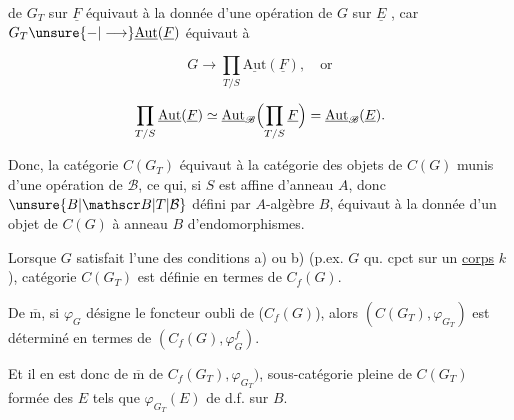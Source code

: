 
de $G_T$ sur $\underline F$ équivaut à la donnée d'une opération de $G$ sur $\underline E$ , car $G_T\unsure{-|\longrightarrow}\underline{\mathrm{Aut}}(\underline F)$ équivaut à

\[
G\longrightarrow\prod_{T/S}\underline{\mathrm{Aut}}(\underline F),\quad\text{or}
\]

\[
\prod_{T/S}\underline{\mathrm{Aut}}(\underline F)\simeq
\underline{\mathrm{Aut}}_{\mathscr B}\Bigl(\prod_{T/S}\underline F\Bigr)
=\underline{\mathrm{Aut}}_{\mathscr B}(\underline E).
\]

Donc, la catégorie $C(G_T)$ équivaut à la catégorie des objets de $C(G)$ munis d'une opération de $\mathscr B$, ce qui, si $S$ est affine d'anneau $A$, donc $\unsure{B|\mathscr B|T|\mathcal B}$ défini par $A$-algèbre $B$, équivaut à la  donnée d'un objet de $C(G)$ à anneau $B$ d'endomorphismes.

Lorsque $G$ satisfait l'une des conditions a) ou b) (p.ex. $G$ qu. cpct sur un \uline{corps} $k$),  catégorie $C(G_T)$ est définie en termes de $C_f(G)$.

De $\overline{\mathrm m}$, si $\varphi_G$  désigne le foncteur oubli de  ($C_f(G)$), alors $(C(G_T),\varphi_{G_T})$ est déterminé en termes de $(C_f(G),\varphi_G^f)$.

Et il en est donc de $\overline{\mathrm m}$ de $C_f(G_T),\varphi_{G_T})$, sous-catégorie pleine de $C(G_T)$ formée des $E$ tels que $\varphi_{G_T}(E)$ de d.f. sur $B$.
